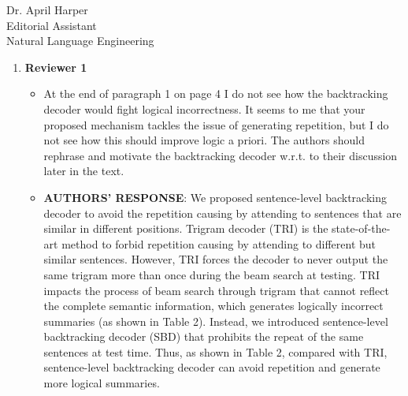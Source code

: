 \documentclass[11pt]{letter} %
\theoremstyle{definition}
\begin{document}
\begin{letter}{Dr. April Harper \\
            Editorial Assistant \\
			Natural Language Engineering}
		\flushleft
		\begin{enumerate}
		    \item \textbf{Reviewer 1}

			\begin{itemize}
				\item At the end of paragraph 1 on page 4 I do not see how the backtracking decoder would fight logical incorrectness. It seems to me that your proposed mechanism tackles the issue of generating repetition, but I do not see how this should improve logic a priori. The authors should rephrase and motivate the backtracking decoder w.r.t. to their discussion later in the text.

				\item[] \textbf{AUTHORS' RESPONSE}: 
				We proposed sentence-level backtracking decoder to avoid the repetition causing by attending to sentences that are similar in different positions. Trigram decoder (TRI) is the state-of-the-art method to forbid repetition causing by attending to different but similar sentences. However, TRI forces the decoder to never output the same trigram more than once during the beam search at testing. TRI impacts the process of beam search through trigram that cannot reflect the  complete semantic information, which generates logically incorrect summaries (as shown in Table 2).  Instead, we introduced sentence-level backtracking decoder (SBD) that prohibits the repeat of the same sentences at test time. Thus, as shown in Table 2, compared with TRI, sentence-level backtracking decoder can avoid repetition and generate more logical summaries.
				

\end{itemize}
\end{enumerate}
\end{letter}
\end{document}
